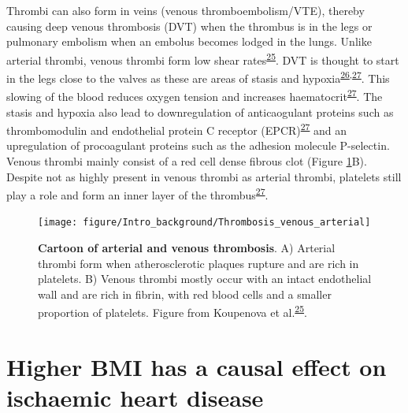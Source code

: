 \documentclass[11pt,twoside]{bristolthesis}
\begin{document}
Thrombi can also form in veins (venous thromboembolism/VTE), thereby causing deep venous thrombosis (DVT) when the thrombus is in the legs or pulmonary embolism when an embolus becomes lodged in the lungs. Unlike arterial thrombi, venous thrombi form low shear rates\textsuperscript{\protect\hyperlink{ref-Koupenova2017a}{25}}. DVT is thought to start in the legs close to the valves as these are areas of stasis and hypoxia\textsuperscript{\protect\hyperlink{ref-Esmon2009}{26},\protect\hyperlink{ref-Stone2017}{27}}. This slowing of the blood reduces oxygen tension and increases haematocrit\textsuperscript{\protect\hyperlink{ref-Stone2017}{27}}. The stasis and hypoxia also lead to downregulation of anticaogulant proteins such as thrombomodulin and endothelial protein C receptor (EPCR)\textsuperscript{\protect\hyperlink{ref-Stone2017}{27}} and an upregulation of procoagulant proteins such as the adhesion molecule P-selectin. Venous thrombi mainly consist of a red cell dense fibrous clot (Figure \ref{fig:thrombi-cartoon}B). Despite not as highly present in venous thrombi as arterial thrombi, platelets still play a role and form an inner layer of the thrombus\textsuperscript{\protect\hyperlink{ref-Stone2017}{27}}.




\begin{figure}

{\centering \texttt{[image: figure/Intro\_background/Thrombosis\_venous\_arterial]} 

}

\caption[Cartoon of arterial and venous thrombosis]{\textbf{Cartoon of arterial and venous thrombosis}. A) Arterial thrombi form when atherosclerotic plaques rupture and are rich in platelets. B) Venous thrombi mostly occur with an intact endothelial wall and are rich in fibrin, with red blood cells and a smaller proportion of platelets. Figure from Koupenova et al.\textsuperscript{\protect\hyperlink{ref-Koupenova2017a}{25}}.}\label{fig:thrombi-cartoon}
\end{figure}
\hypertarget{higher-bmi-has-a-causal-effect-on-ischaemic-heart-disease}{%
\section{Higher BMI has a causal effect on ischaemic heart disease}\label{higher-bmi-has-a-causal-effect-on-ischaemic-heart-disease}}
\end{document}
